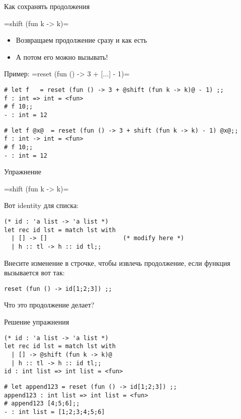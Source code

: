 \documentclass{beamer}
\begin{document}
\begin{frame}[fragile]{Как сохранять продолжения}
\begin{block}{}
\camline=shift (fun k -> k)=
\end{block}
\begin{itemize}
\item Возвращаем продолжение сразу и как есть
\item А потом его можно вызывать!
\end{itemize}

Пример: \camline=reset (fun () -> 3 + [...] - 1)=
\begin{lstlisting}[style={camlstyle1}]
# let f   = reset (fun () -> 3 + @shift (fun k -> k)@ - 1) ;;
f : int => int = <fun>
# f 10;;
- : int = 12
\end{lstlisting}

\begin{lstlisting}[style={camlstyle1}]
# let f @x@  = reset (fun () -> 3 + shift (fun k -> k) - 1) @x@;;
f : int -> int = <fun>
# f 10;;
- : int = 12
\end{lstlisting}
\end{frame}

\begin{frame}[fragile]{Упражнение}
\begin{block}{}
\camline=shift (fun k -> k)=
\end{block}

Вот identity для списка:
\begin{lstlisting}[style={camlstyle1}]
(* id : 'a list -> 'a list *)
let rec id lst = match lst with 
  | [] -> []                     (* modify here *)
  | h :: tl -> h :: id tl;; 
\end{lstlisting}
Внесите изменение в строчке, чтобы извлечь продолжение, если функция вызывается вот так:
\begin{lstlisting}[style={camlstyle1}]
reset (fun () -> id[1;2;3]) ;;
\end{lstlisting}
Что это продолжение делает?
\end{frame}

\begin{frame}[fragile]{Решение упражнения}
\begin{lstlisting}[style={camlstyle1}]
(* id : 'a list -> 'a list *)
let rec id lst = match lst with 
  | [] -> @shift (fun k -> k)@
  | h :: tl -> h :: id tl;; 
id : int list => int list = <fun>
\end{lstlisting}
\pause
\begin{lstlisting}[style={camlstyle1}]
# let append123 = reset (fun () -> id[1;2;3]) ;;
append123 : int list => int list = <fun>
# append123 [4;5;6];;
- : int list = [1;2;3;4;5;6]
\end{lstlisting}
\end{frame}
\end{document}
